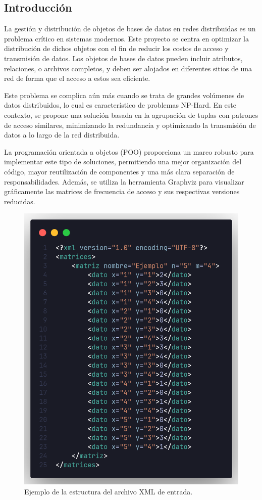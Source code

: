\documentclass[letterpaper,12pt]{article}
\begin{document}
\begin{multicols}{2}
    \section*{Introducción}
    La gestión y distribución de objetos de bases de datos en redes distribuidas es un problema crítico en sistemas modernos. Este proyecto se centra en optimizar la distribución de dichos objetos con el fin de reducir los costos de acceso y transmisión de datos. Los objetos de bases de datos pueden incluir atributos, relaciones, o archivos completos, y deben ser alojados en diferentes sitios de una red de forma que el acceso a estos sea eficiente.

    Este problema se complica aún más cuando se trata de grandes volúmenes de datos distribuidos, lo cual es característico de problemas NP-Hard. En este contexto, se propone una solución basada en la agrupación de tuplas con patrones de acceso similares, minimizando la redundancia y optimizando la transmisión de datos a lo largo de la red distribuida.

    La programación orientada a objetos (POO) proporciona un marco robusto para implementar este tipo de soluciones, permitiendo una mejor organización del código, mayor reutilización de componentes y una más clara separación de responsabilidades. Además, se utiliza la herramienta Graphviz para visualizar gráficamente las matrices de frecuencia de acceso y sus respectivas versiones reducidas.

    \begin{figure}[H]
        \centering
        \includegraphics[width=\columnwidth]{images/xml_structure.png}
        \caption{Ejemplo de la estructura del archivo XML de entrada.}
    \end{figure}


\end{multicols}
\end{document}
